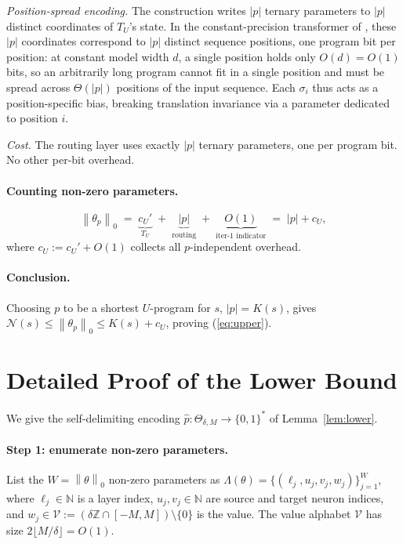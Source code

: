 \documentclass{article}
\theoremstyle{definition}
\newcommand{\Z}{\mathbb{Z}}
\newcommand{\N}{\mathbb{N}}
\newcommand{\B}{\{0,1\}}
\newcommand{\norm}[1]{\left\lVert#1\right\rVert}
\newcommand{\nc}{\mathcal{N}}
\newcommand{\Param}{\Theta}
\begin{document}
\emph{Position-spread encoding.} The construction writes $|p|$ ternary
parameters to $|p|$ distinct coordinates of $T_U$'s state. In the
constant-precision transformer of \citet{li2025constant}, these $|p|$
coordinates correspond to $|p|$ distinct sequence positions, one program bit
per position: at constant model width $d$, a single position holds only $O(d)
  = O(1)$ bits, so an arbitrarily long program cannot fit in a single position
and must be spread across $\Theta(|p|)$ positions of the input sequence. Each
$\sigma_i$ thus acts as a position-specific bias, breaking translation
invariance via a parameter dedicated to position $i$.

\emph{Cost.} The routing layer uses exactly $|p|$ ternary parameters, one per
program bit. No other per-bit overhead.

\paragraph{Counting non-zero parameters.}
\[
  \norm{\theta_p}_0 \;=\; \underbrace{c_U'}_{T_U} \;+\; \underbrace{|p|}_{\text{routing}} \;+\; \underbrace{O(1)}_{\text{iter-1 indicator}} \;=\; |p| + c_U,
\]
where $c_U := c_U' + O(1)$ collects all $p$-independent overhead.

\paragraph{Conclusion.} Choosing $p$ to be a shortest $U$-program for $s$, $|p| = K(s)$, gives $\nc(s)
  \le \norm{\theta_p}_0 \le K(s) + c_U$, proving (\ref{eq:upper}).

\section{Detailed Proof of the Lower Bound}\label{app:lower}

We give the self-delimiting encoding $\hat p : \Param_{\delta, M} \to \B^*$ of
Lemma~\ref{lem:lower}.

\paragraph{Step 1: enumerate non-zero parameters.} List the $W = \norm{\theta}_0$ non-zero parameters as $\Lambda(\theta) =
  \{(\ell_j, u_j, v_j, w_j)\}_{j=1}^{W}$, where $\ell_j \in \N$ is a layer index,
$u_j, v_j \in \N$ are source and target neuron indices, and $w_j \in
  \mathcal{V} := (\delta\Z \cap [-M, M]) \setminus \{0\}$ is the value. The value
alphabet $\mathcal{V}$ has size $2 \lfloor M/\delta \rfloor = O(1)$.
\end{document}
